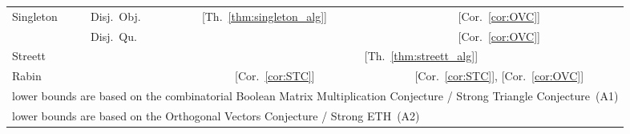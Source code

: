 \documentclass[11pt,letterpaper]{article}
\newif\iffullversion
\newcommand{\infull}[1]{\iffullversion #1\fi}
\newcommand{\inshort}[1]{\iffullversion \else #1\fi}
\begin{document}
\begin{table*}[!t]
\begin{tabular}{@{}*{2}{l}*{4}{c}@{}}
\cmidrule{2-6}
Singleton & Disj.\ Obj.& \multicolumn{2}{c}{\multirow{2}{*}{ \inshort{[Th.~\ref{thm:singleton_alg}]}\phantom{abcdef}}} & &  \inshort{[Cor.~\ref{cor:OVC}]}\\
& Disj.\ Qu. & & & &  \inshort{[Cor.~\ref{cor:OVC}]}\\
\midrule
Streett & & \multicolumn{2}{l}{
\cite{HenzingerT96,ChatterjeeHL15}}
& \multicolumn{2}{l}{ \inshort{[Th.~\ref{thm:streett_alg}]}}\\
\midrule
Rabin & &  & 
 \inshort{[Cor.~\ref{cor:STC}]}
&  & 
 \inshort{[Cor.~\ref{cor:STC}]},  \inshort{[Cor.~\ref{cor:OVC}]}\\
\bottomrule
\multicolumn{6}{l}{  lower bounds  are based on the \inshort{combinatorial Boolean Matrix Multiplication}\infull{BMM} Conjecture / Strong Triangle Conjecture~(A1)
} \\ 
\multicolumn{6}{l}{\phantom{}  lower bounds are based on the Orthogonal Vectors Conjecture
/ Strong ETH~(A2)
}
\end{tabular}
\end{table*}
\end{document}
